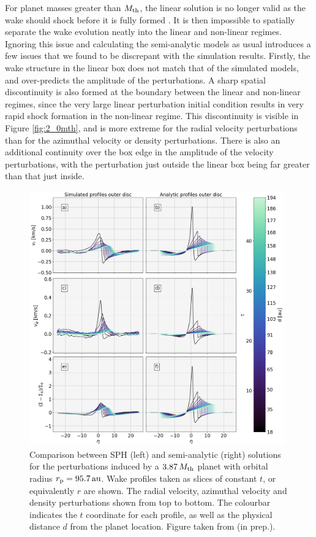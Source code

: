 For planet masses greater than $M_{\rm th}$, the linear solution is no longer valid as the wake should shock before it is fully formed \citep{goodman2001}.
It is then impossible to spatially separate the wake evolution neatly into the linear and non-linear regimes.
Ignoring this issue and calculating the semi-analytic models as usual introduces a few issues that we found to be discrepant with the simulation results.
Firstly, the wake structure in the linear box does not match that of the simulated models, and over-predicts the amplitude of the perturbations.
A sharp spatial discontinuity is also formed at the boundary between the linear and non-linear regimes, since the very large linear perturbation initial condition results in very rapid shock formation in the non-linear regime.
This discontinuity is visible in Figure \ref{fig:2_0mth}, and is more extreme for the radial velocity perturbations than for the azimuthal velocity or density perturbations.
There is also an additional continuity over the box edge in the amplitude of the velocity perturbations, with the perturbation just outside the linear box being far greater than that just inside.

\begin{figure}[H]
    \centering
    \includegraphics[width = 0.98\textwidth]{figures/comp_as_prof_out_high.png}
    \caption{Comparison between SPH (left) and semi-analytic (right) solutions for the perturbations induced by a $3.87 \, M_{\rm th}$ planet with orbital radius $r_{\rm p}=95.7 \, \mathrm{au}$. Wake profiles taken as slices of constant $t$, or equivalently $r$ are shown. The radial velocity, azimuthal velocity and density perturbations shown from top to bottom. The colourbar indicates the $t$ coordinate for each profile, as well as the physical distance $d$ from the planet location. Figure taken from \citeauthor{fasanoinprep.} (in prep.).}
    \label{fig:profile_comparison}
\end{figure}

